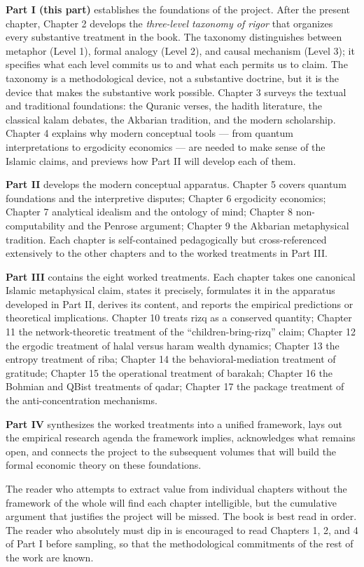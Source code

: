 \textbf{Part I (this part)} establishes the foundations of the
project. After the present chapter, Chapter 2 develops the
\emph{three-level taxonomy of rigor} that organizes every
substantive treatment in the book. The taxonomy distinguishes between
metaphor (Level 1), formal analogy (Level 2), and causal mechanism
(Level 3); it specifies what each level commits us to and what each
permits us to claim. The taxonomy is a methodological device, not a
substantive doctrine, but it is the device that makes the
substantive work possible. Chapter 3 surveys the textual and
traditional foundations: the Quranic verses, the hadith literature,
the classical kalam debates, the Akbarian tradition, and the modern
scholarship. Chapter 4 explains why modern conceptual tools --- from
quantum interpretations to ergodicity economics --- are needed to
make sense of the Islamic claims, and previews how Part II will
develop each of them.

\textbf{Part II} develops the modern conceptual apparatus. Chapter 5
covers quantum foundations and the interpretive disputes; Chapter 6
ergodicity economics; Chapter 7 analytical idealism and the
ontology of mind; Chapter 8 non-computability and the Penrose
argument; Chapter 9 the Akbarian metaphysical tradition. Each
chapter is self-contained pedagogically but cross-referenced
extensively to the other chapters and to the worked treatments in
Part III.

\textbf{Part III} contains the eight worked treatments. Each chapter
takes one canonical Islamic metaphysical claim, states it precisely,
formulates it in the apparatus developed in Part II, derives its
content, and reports the empirical predictions or theoretical
implications. Chapter 10 treats rizq as a conserved quantity;
Chapter 11 the network-theoretic treatment of the
``children-bring-rizq'' claim; Chapter 12 the ergodic treatment of
halal versus haram wealth dynamics; Chapter 13 the entropy
treatment of riba; Chapter 14 the behavioral-mediation treatment of
gratitude; Chapter 15 the operational treatment of barakah; Chapter
16 the Bohmian and QBist treatments of qadar; Chapter 17 the
package treatment of the anti-concentration mechanisms.

\textbf{Part IV} synthesizes the worked treatments into a unified
framework, lays out the empirical research agenda the framework
implies, acknowledges what remains open, and connects the project to
the subsequent volumes that will build the formal economic theory on
these foundations.

The reader who attempts to extract value from individual chapters
without the framework of the whole will find each chapter
intelligible, but the cumulative argument that justifies the project
will be missed. The book is best read in order. The reader who
absolutely must dip in is encouraged to read Chapters 1, 2, and 4 of
Part I before sampling, so that the methodological commitments of
the rest of the work are known.

